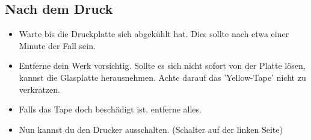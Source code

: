 \documentclass[a4paper]{article}
\begin{document}
\subsection{Nach dem Druck}
\begin{itemize}
	\item Warte bis die Druckplatte sich abgekühlt hat. Dies sollte nach etwa einer Minute der Fall sein.
	\item Entferne dein Werk vorsichtig. Sollte es sich nicht sofort von der Platte lösen, kannst die Glasplatte herausnehmen. Achte darauf das 'Yellow-Tape' nicht zu verkratzen.
	\item Falls das Tape doch beschädigt ist, entferne alles.
	\item Nun kannst du den Drucker ausschalten. (Schalter auf der linken Seite)
\end{itemize}
\end{document}

